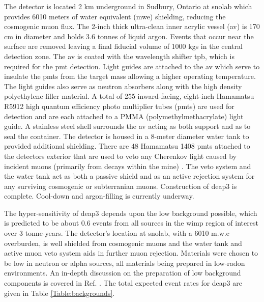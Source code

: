 The detector is located 2 km underground in Sudbury, Ontario at \gls{snolab} which provides 6010 meters of water equivalent (\gls{mwe}) shielding, reducing the cosmogenic muon flux. The 2-inch thick ultra-clean inner acrylic vessel (\gls{av}) is 170 cm in diameter and holds 3.6 tonnes of liquid argon. Events that occur near the surface are removed leaving a final fiducial volume of 1000 kgs in the central detection zone. The \gls{av} is coated with the wavelength shifter \gls{tpb}, which is required for the \gls{pmt} detection. Light guides are attached to the \gls{av} which serve to insulate the \gls{pmt}s from the target mass allowing a higher operating temperature. The light guides also serve as neutron absorbers along with the high density polyethylene filler material. A total of 255 inward-facing, eight-inch Hamamatsu R5912 high quantum efficiency photo multiplier tubes (\gls{pmt}s) are used for detection and are each attached to a PMMA (polymethylmethacrylate) light guide. A stainless steel shell surrounds the \gls{av} acting as both support and as to seal the container. The detector is housed in a 8-meter diameter water tank to provided additional shielding. There are 48 Hamamatsu 1408 \gls{pmt}s attached to the detectors exterior that are used to veto any Cherenkov light caused by incident muons (primarily from decays within the mine) \cite{tinaPollmann}. The veto system and the water tank act as both a passive shield and as an active rejection system for any surviving cosmogenic or subterranian muons. Construction of \gls{deap3} is complete. Cool-down and argon-filling is currently underway.

The hyper-sensitivity of \gls{deap3} depends upon the low background possible, which is predicted to be about 0.6 events from all sources in the \gls{wimp} region of interest over 3 tonne-years. The detector's location at \gls{snolab}, with a 6010 m.w.e overburden, is well shielded from cosmogenic muons and the water tank and active muon veto system aids in further muon rejection. Materials were chosen to be low in neutron or alpha sources, all materials being prepared in low-radon environments. An in-depth discussion on the preparation of low background components is covered in Ref. \cite{deap3DarkMatterSearch}. The total expected event rates for \gls{deap3} are given in Table \ref{Table:backgrounds}.


